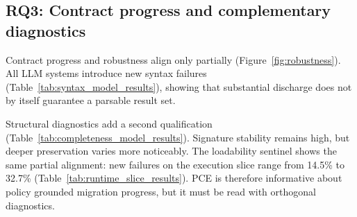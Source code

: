 \subsection{RQ3: Contract progress and complementary diagnostics}
\label{sec:syntax_and_structure}

Contract progress and robustness align only partially
(Figure~\ref{fig:robustness}). All LLM systems introduce new syntax
failures
(Table~\ref{tab:syntax_model_results}), showing that substantial discharge
does not by itself guarantee a parsable result set.

Structural diagnostics add a second qualification
(Table~\ref{tab:completeness_model_results}). Signature stability remains
high, but deeper preservation varies more noticeably. The loadability
sentinel shows the same partial alignment: new failures on the execution
slice range from 14.5\% to 32.7\%
(Table~\ref{tab:runtime_slice_results}). PCE is therefore informative about
policy grounded migration progress, but it must be read with orthogonal
diagnostics.

